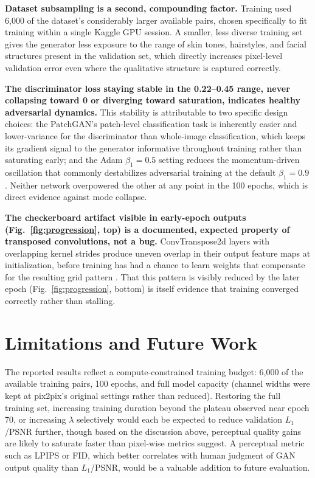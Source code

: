 \documentclass[conference]{IEEEtran}
\begin{document}
\textbf{Dataset subsampling is a second, compounding factor.} Training used 6{,}000 of
the dataset's considerably larger available pairs, chosen specifically to fit training
within a single Kaggle GPU session. A smaller, less diverse training set gives the
generator less exposure to the range of skin tones, hairstyles, and facial structures
present in the validation set, which directly increases pixel-level validation error even
where the qualitative structure is captured correctly.

\textbf{The discriminator loss staying stable in the 0.22--0.45 range, never collapsing
toward 0 or diverging toward saturation, indicates healthy adversarial dynamics.} This
stability is attributable to two specific design choices: the PatchGAN's patch-level
classification task is inherently easier and lower-variance for the discriminator than
whole-image classification, which keeps its gradient signal to the generator informative
throughout training rather than saturating early; and the Adam $\beta_1=0.5$ setting
reduces the momentum-driven oscillation that commonly destabilizes adversarial training
at the default $\beta_1=0.9$. Neither network overpowered the other at any point in the
100 epochs, which is direct evidence against mode collapse.

\textbf{The checkerboard artifact visible in early-epoch outputs (Fig.~\ref{fig:progression},
top) is a documented, expected property of transposed convolutions, not a bug.}
ConvTranspose2d layers with overlapping kernel strides produce uneven overlap in their
output feature maps at initialization, before training has had a chance to learn weights
that compensate for the resulting grid pattern \cite{odena2016checkerboard}. That this
pattern is visibly reduced by the later epoch (Fig.~\ref{fig:progression}, bottom)
is itself evidence that training converged correctly rather than stalling.

\section{Limitations and Future Work}

The reported results reflect a compute-constrained training budget: 6{,}000 of the
available training pairs, 100 epochs, and full model capacity (channel widths were kept
at pix2pix's original settings rather than reduced). Restoring the full training set,
increasing training duration beyond the plateau observed near epoch 70, or increasing
$\lambda$ selectively would each be expected to reduce validation $L_1$/PSNR further,
though based on the discussion above, perceptual quality gains are likely to
saturate faster than pixel-wise metrics suggest. A perceptual metric such as LPIPS or
FID, which better correlates with human judgment of GAN output quality than $L_1$/PSNR,
would be a valuable addition to future evaluation.
\end{document}
